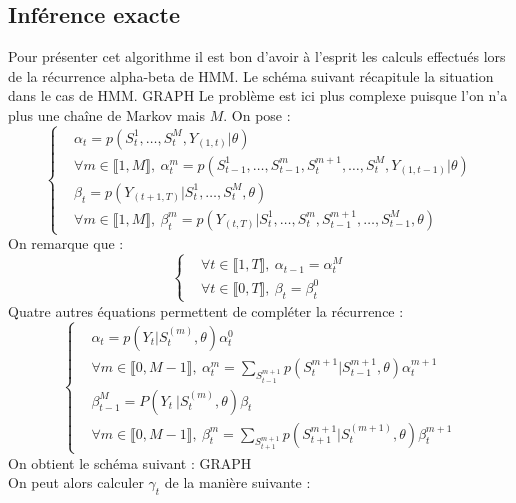 \documentclass[10pt,a4paper]{article}
\newcommand{\hmm}{\textsc{HMM}}
\begin{document}
\subsection{Inférence exacte}
Pour présenter cet algorithme il est bon d'avoir à l'esprit les calculs effectués lors de la récurrence alpha-beta de \hmm. Le schéma suivant récapitule la situation dans le cas de \hmm.
GRAPH 
Le problème est ici plus complexe puisque l'on n'a plus une chaîne de Markov mais $M$. On pose :
\begin{equation}
\left\lbrace
\begin{aligned}
&\alpha_t=p(S_t^{1},\dots,S_t^{M},Y_{(1,t)}\vert \theta) \\
&\forall m \in \llbracket 1,M \rrbracket, \ \alpha_t^m=p(S_{t-1}^1, \dots, S_{t-1}^m,S_{t}^{m+1}, \dots, S_{t}^M, Y_{(1,t-1)} \vert \theta) \\
&\beta_t=p(Y_{(t+1,T)} \vert S_t^1, \dots,S_t^M, \theta) \\
&\forall m \in \llbracket 1,M \rrbracket, \ \beta_t^m=p(Y_{(t,T)} \vert S_t^1, \dots, S_t^m,S_{t-1}^{m+1}, \dots, S_{t-1}^M, \theta)
\end{aligned}
\right.
\end{equation}
On remarque que :
\begin{equation}
\left\lbrace 
\begin{aligned}
&\forall t \in \llbracket 1,T \rrbracket, \ \alpha_{t-1}=\alpha_{t}^M  \\
&\forall t \in \llbracket 0,T \rrbracket, \ \beta_{t}=\beta_{t}^0
\end{aligned}
\right.
\end{equation}
Quatre autres équations permettent de compléter la récurrence :
\begin{equation}
\left\lbrace
\begin{aligned}
&\alpha_t=p(Y_t \vert S_t^{(m)}, \theta)\alpha_t^0 \\
&\forall m \in \llbracket 0,M-1 \rrbracket, \ \alpha_t^m=\underset{S_{t-1}^{m+1}}{\sum}p(S_t^{m+1} \vert S_{t-1}^{m+1}, \theta) \alpha_t^{m+1} \\
&\beta_{t-1}^M=P( Y_t \ \vert S_t^{(m)},\theta) \beta_t \\
&\forall m \in \llbracket 0, M-1 \rrbracket, \ \beta_t^{m}=\underset{S_{t+1}^{m+1}}{\sum}p(S_{t+1}^{m+1} \vert S_{t}^{(m+1)}, \theta) \beta_{t}^{m+1}
\end{aligned}
\right.
\end{equation}
On obtient le schéma suivant : GRAPH\\
On peut alors calculer $\gamma_t$ de la manière suivante :
\end{document}
